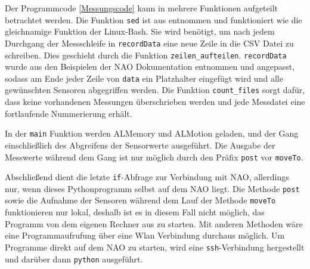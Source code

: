 Der Programmcode \ref{Messungscode} kann in mehrere Funktionen aufgeteilt betrachtet werden. Die Funktion \texttt{sed} ist aus \cite{sed_python} entnommen und funktioniert wie die gleichnamige Funktion der Linux-Bash. Sie wird benötigt, um nach jedem Durchgang der Messschleife in \texttt{recordData} eine neue Zeile in die CSV Datei zu schreiben. Dies geschieht durch die Funktion \texttt{zeilen\_aufteilen}. \texttt{recordData} wurde aus den Beispielen der NAO Dokumentation \cite[/Other tutorials/Python SDK - Tutorials/Python SDK - Examples/Sensors]{naoqi_dev_guide} entnommen und angepasst, sodass am Ende jeder Zeile von \texttt{data} ein Platzhalter eingefügt wird und alle gewünschten Sensoren abgegriffen werden. Die Funktion \texttt{count\_files} sorgt dafür, dass keine vorhandenen Messungen überschrieben werden und jede Messdatei eine fortlaufende Nummerierung erhält. 

In der \texttt{main} Funktion werden ALMemory und ALMotion geladen, und der Gang einschließlich des Abgreifens der Sensorwerte ausgeführt. Die Ausgabe der Messwerte während dem Gang ist nur möglich durch den Präfix \texttt{post} vor \texttt{moveTo}.

Abschließend dient die letzte \texttt{if}-Abfrage zur Verbindung mit NAO, allerdings nur, wenn dieses Pythonprogramm selbst auf dem NAO liegt. Die Methode \texttt{post} sowie die Aufnahme der Sensoren während dem Lauf der Methode \texttt{moveTo} funktionieren nur lokal, deshalb ist es in diesem Fall nicht möglich, das Programm von dem eigenen Rechner aus zu starten. Mit anderen Methoden wäre eine Programmaufrufung über eine Wlan Verbindung durchaus möglich. Um Programme direkt auf dem NAO zu starten, wird eine \texttt{ssh}-Verbindung hergestellt und darüber dann \texttt{python} ausgeführt.
		

